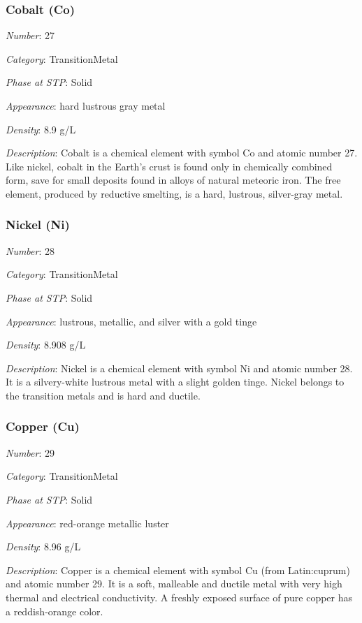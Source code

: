 \documentclass{article}
\begin{document}
\hypertarget{subsubsection::Co}{}\subsubsection{Cobalt (Co)}

\textit{Number}: 27

\textit{Category}: TransitionMetal

\textit{Phase at STP}: Solid

\textit{Appearance}: hard lustrous gray metal

\textit{Density}: 8.9 g/L

\textit{Description}: Cobalt is a chemical element with symbol Co and atomic number 27. Like nickel, cobalt in the Earth's crust is found only in chemically combined form, save for small deposits found in alloys of natural meteoric iron. The free element, produced by reductive smelting, is a hard, lustrous, silver-gray metal.

\hypertarget{subsubsection::Ni}{}\subsubsection{Nickel (Ni)}

\textit{Number}: 28

\textit{Category}: TransitionMetal

\textit{Phase at STP}: Solid

\textit{Appearance}: lustrous, metallic, and silver with a gold tinge

\textit{Density}: 8.908 g/L

\textit{Description}: Nickel is a chemical element with symbol Ni and atomic number 28. It is a silvery-white lustrous metal with a slight golden tinge. Nickel belongs to the transition metals and is hard and ductile.

\hypertarget{subsubsection::Cu}{}\subsubsection{Copper (Cu)}

\textit{Number}: 29

\textit{Category}: TransitionMetal

\textit{Phase at STP}: Solid

\textit{Appearance}: red-orange metallic luster

\textit{Density}: 8.96 g/L

\textit{Description}: Copper is a chemical element with symbol Cu (from Latin:cuprum) and atomic number 29. It is a soft, malleable and ductile metal with very high thermal and electrical conductivity. A freshly exposed surface of pure copper has a reddish-orange color.
\end{document}
